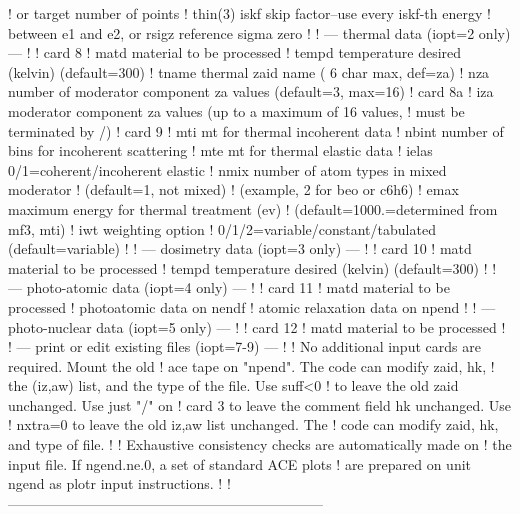 \begin{ccode}
   !             or target number of points
   !    thin(3)  iskf skip factor--use every iskf-th energy
   !             between e1 and e2, or rsigz reference sigma zero
   !
   !   --- thermal data (iopt=2 only) ---
   !
   ! card 8
   !    matd     material to be processed
   !    tempd    temperature desired (kelvin) (default=300)
   !    tname    thermal zaid name ( 6 char max, def=za)
   !    nza      number of moderator component za values (default=3, max=16)
   ! card 8a
   !    iza      moderator component za values (up to a maximum of 16 values,
   !             must be terminated by /)
   ! card 9
   !    mti      mt for thermal incoherent data
   !    nbint    number of bins for incoherent scattering
   !    mte      mt for thermal elastic data
   !    ielas    0/1=coherent/incoherent elastic
   !    nmix     number of atom types in mixed moderator
   !             (default=1, not mixed)
   !             (example, 2 for beo or c6h6)
   !    emax     maximum energy for thermal treatment (ev)
   !             (default=1000.=determined from mf3, mti)
   !    iwt      weighting option
   !             0/1/2=variable/constant/tabulated (default=variable)
   !
   !   --- dosimetry data (iopt=3 only) ---
   !
   ! card 10
   !    matd     material to be processed
   !    tempd    temperature desired (kelvin) (default=300)
   !
   !   --- photo-atomic data (iopt=4 only) ---
   !
   ! card 11
   !    matd     material to be processed
   !             photoatomic data on nendf
   !             atomic relaxation data on npend
   !
   !   --- photo-nuclear data (iopt=5 only) ---
   !
   ! card 12
   !    matd     material to be processed
   !
   !   --- print or edit existing files (iopt=7-9) ---
   !
   !    No additional input cards are required.  Mount the old
   !    ace tape on "npend".  The code can modify zaid, hk,
   !    the (iz,aw) list, and the type of the file.  Use suff<0
   !    to leave the old zaid unchanged.  Use just "/" on
   !    card 3 to leave the comment field hk unchanged.  Use
   !    nxtra=0 to leave the old iz,aw list unchanged.  The
   !    code can modify zaid, hk, and type of file.
   !
   !    Exhaustive consistency checks are automatically made on
   !    the input file.  If ngend.ne.0, a set of standard ACE plots
   !    are prepared on unit ngend as plotr input instructions.
   !
   !--------------------------------------------------------------------

\end{ccode}
\normalsize

